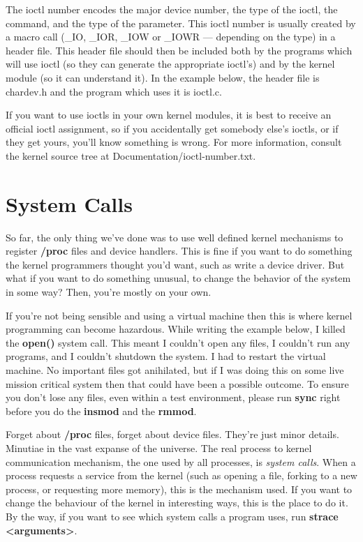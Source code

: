 \documentclass[10pt, oneside]{book}
\begin{document}
The ioctl number encodes the major device number, the type of the ioctl, the command, and the type of the parameter. This ioctl number is usually created by a macro call (\_IO, \_IOR, \_IOW or \_IOWR --- depending on the type) in a header file. This header file should then be included both by the programs which will use ioctl (so they can generate the appropriate ioctl's) and by the kernel module (so it can understand it). In the example below, the header file is chardev.h and the program which uses it is ioctl.c.

If you want to use ioctls in your own kernel modules, it is best to receive an official ioctl assignment, so if you accidentally get somebody else's ioctls, or if they get yours, you'll know something is wrong. For more information, consult the kernel source tree at Documentation/ioctl-number.txt.




\section{System Calls}
\label{sec:orga925e22}
So far, the only thing we've done was to use well defined kernel mechanisms to register \textbf{/proc} files and device handlers. This is fine if you want to do something the kernel programmers thought you'd want, such as write a device driver. But what if you want to do something unusual, to change the behavior of the system in some way? Then, you're mostly on your own.

If you're not being sensible and using a virtual machine then this is where kernel programming can become hazardous. While writing the example below, I killed the \textbf{open()} system call. This meant I couldn't open any files, I couldn't run any programs, and I couldn't shutdown the system. I had to restart the virtual machine. No important files got anihilated, but if I was doing this on some live mission critical system then that could have been a possible outcome. To ensure you don't lose any files, even within a test environment, please run \textbf{sync} right before you do the \textbf{insmod} and the \textbf{rmmod}.

Forget about \textbf{/proc} files, forget about device files. They're just minor details. Minutiae in the vast expanse of the universe. The real process to kernel communication mechanism, the one used by all processes, is \emph{system calls}. When a process requests a service from the kernel (such as opening a file, forking to a new process, or requesting more memory), this is the mechanism used. If you want to change the behaviour of the kernel in interesting ways, this is the place to do it. By the way, if you want to see which system calls a program uses, run \textbf{strace <arguments>}.
\end{document}
